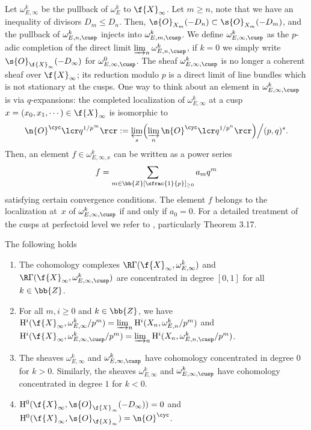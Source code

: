 Let $\omega_{E,\infty}^{k}$ be the pullback of $\omega_E^k$ to $\f{X}_{\infty}$. Let $m\geq n$, note that we have an inequality of divisors $D_m\leq D_n$. Then, $\s{O}_{X_m}(-D_n)\subset \s{O}_{X_m}(-D_m)$, and the pullback of $\omega^k_{E,n,\cusp}$ injects into $\omega^k_{E,m,\cusp}$. We define $\omega^{k}_{E,\infty,\cusp}$ as the $p$-adic completion of the direct limit $\varinjlim_n \omega^k_{E,n,\cusp}$, if $k=0$ we simply write $\s{O}_{\f{X}_{\infty}}(-D_{\infty})$ for $\omega^0_{E,\infty, \cusp}$. The sheaf $\omega^k_{E,\infty,\cusp}$ is no longer a coherent sheaf over $\f{X}_\infty$; its reduction modulo $p$ is a direct limit of line bundles which is not stationary at the cusps. One way to think about an element in $\omega^k_{E,\infty,\cusp}$ is via $q$-expansions: the completed localization of $\omega^k_{E,\infty}$ at a cusp $x=(x_0,x_1,\cdots)\in \f{X}_{\infty}$ is isomorphic to
\[
\n{O}^{\cyc}\lcr q^{1/p^\infty}\rcr:= \varprojlim_{s} \Bigl(\varinjlim_n \n{O}^{\cyc}\lcr q^{1/p^n}\rcr\Bigr)\Big/(p,q)^s.
\]
Then, an element $f\in \omega^k_{E,\infty,x}$ can be written as a power series
\[
f= \sum_{m\in \bb{Z}[\sfrac{1}{p}]_{\geq 0}} a_m q^{m}
\]
satisfying certain convergence conditions. The element $f$ belongs to the localization at~$x$ of $\omega^k_{E,\infty, \cusp}$ if and only if $a_0=0$. For a detailed treatment of the cusps at perfectoid level we refer to \cite{heuer2020cusps}, particularly Theorem 3.17.

\begin{theo}
\label{corVanishingCohPerfectoid}
The following holds

\begin{enumerate}
\item\label{corVanishingCohPerfectoid1} The cohomology complexes $\R\Gamma(\f{X}_{\infty}, \omega^k_{E,\infty})$ and $\R\Gamma(\f{X}_{\infty}, \omega^k_{E,\infty,\cusp})$ are concentrated in degree $[0,1]$ for all $k\in \bb{Z}$.

\item\label{corVanishingCohPerfectoid2} For all $m,i\geq 0$ and $k\in \bb{Z}$, we have $\mathrm{H}^i(\f{X}_{\infty}, \omega^k_{E,\infty}/p^m)=\varinjlim_n \mathrm{H}^i(X_n, \omega^k_{E,n}/p^m)$ and $\mathrm{H}^i(\f{X}_{\infty}, \omega^k_{E,\infty,\cusp}/p^m)=\varinjlim_n \mathrm{H}^i(X_n, \omega^k_{E,n,\cusp}/p^m)$.

\item\label{corVanishingCohPerfectoid3} The sheaves $\omega_{E,\infty}^{k}$ and $\omega_{E,\infty,\cusp}^k$ have cohomology concentrated in degree $0$ for $k>0$. Similarly, the sheaves $\omega_{E,\infty}^{k}$ and $\omega_{E,\infty,\cusp}^{k}$ have cohomology concentrated in degree $1$ for $k<0$.

\item\label{corVanishingCohPerfectoid4} $\mathrm{H}^0(\f{X}_{\infty}, \s{O}_{\f{X}_{\infty}}(-D_{\infty}))=0$ and $\mathrm{H}^0(\f{X}_{\infty}, \s{O}_{\f{X}_{\infty}})= \n{O}^{\cyc} $.
\end{enumerate}
\end{theo}

